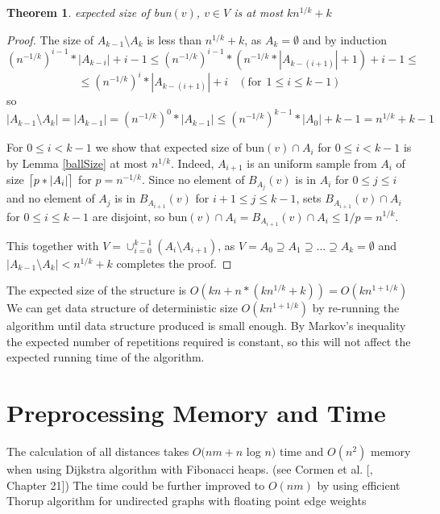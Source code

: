 \documentclass[shortabstract, lic, english]{iithesis}
\theoremstyle{definition} \newtheorem{definition}{Definition}[chapter]
\theoremstyle{remark} \newtheorem{remark}[definition]{Observation}
\theoremstyle{plain} \newtheorem{theorem}[definition]{Theorem}
\theoremstyle{plain} \newtheorem{lemma}[definition]{Lemma}
\theoremstyle{plain} \newtheorem{conjecture}[definition]{Conjecture}
\DeclarePairedDelimiter{\ceil}{\lceil}{\rceil}
\begin{document}
\begin{theorem}
    expected size of bun$(v)$, $v \in V$ is at most $kn^{1/k} + k$
\end{theorem}
\begin{proof}
    The size of $A_{k-1} \setminus A_k$ is less than $n^{1/k} + k$, as $A_k = \emptyset$ and by induction
    $$(n^{-1/k})^{i-1} * |A_{k-i}| + i - 1 \leq (n^{-1/k})^{i-1} * (n^{-1/k} * |A_{k-(i+1)}| + 1) + i - 1 \leq$$ 
    $$\leq (n^{-1/k})^{i} * |A_{k-(i+1)}| + i~~~~(\text{for}~~1 \leq i \leq k-1)$$
    so $|A_{k-1} \setminus A_k| = |A_{k-1}| = (n^{-1/k})^0 * |A_{k-1}| \leq (n^{-1/k})^{k-1} * |A_{0}| + k - 1 = n^{1/k} + k - 1$
    
    For $0 \leq i < k-1$ we show that expected size of bun$(v) \cap A_i$ for $0 \leq i < k-1$ is by Lemma \ref{ballSize}
    at most $n^{1/k}$. Indeed, $A_{i+1}$ is an uniform sample from $A_i$ of size $\ceil[\big]{p * |A_i|}$ for $p = n^{-1/k}$.
    Since no element of $B_{A_j}(v)$ is in $A_i$ for $0 \leq j \leq i$ and
    no element of $A_{j}$ is in $B_{A_{i+1}}(v)$ for $i+1 \leq j \leq k-1$, sets $B_{A_{i+1}}(v) \cap A_i$ for $0 \leq i \leq k-1$ are disjoint, so
    bun$(v) \cap A_i = B_{A_{i+1}}(v) \cap A_i \leq 1/p = n^{1/k}$.
    
    This together with $V = \cup_{i=0}^{k-1} (A_i \setminus A_{i+1})$, as $V = A_0 \supseteq A_1 \supseteq \ldots \supseteq A_k = \emptyset$
    and $|A_{k-1} \setminus A_k| < n^{1/k} + k$ completes the proof.
\end{proof}

The expected size of the structure is $O(kn + n*(kn^{1/k}+k)) = O(kn^{1 + 1/k})$
We can get data structure of deterministic size $O(kn^{1 + 1/k})$ by re-running the algorithm
until data structure produced is small enough.
By Markov's inequality the expected number of repetitions required is constant, so this will not
affect the expected running time of the algorithm.

\section{Preprocessing Memory and Time}

The calculation of all distances takes $O(nm + n $ log $n)$ time and $O(n^2)$ memory
when using Dijkstra algorithm with Fibonacci heaps. (see Cormen et al. [\cite{cormen}, Chapter 21])
The time could be further improved to $O(nm)$ by using efficient Thorup algorithm for undirected graphs with floating point edge weights\cite{uberDijkstraInt}\cite{uberDijkstraFloat}
\end{document}
